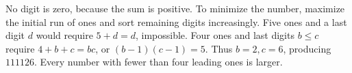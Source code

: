 No digit is zero, because the sum is positive. To minimize the number, maximize the initial run of ones and sort remaining digits increasingly. Five ones and a last digit $d$ would require $5+d=d$, impossible. Four ones and last digits $b\le c$ require $4+b+c=bc$, or $(b-1)(c-1)=5$. Thus $b=2,c=6$, producing $\boxed{111126}$. Every number with fewer than four leading ones is larger.
